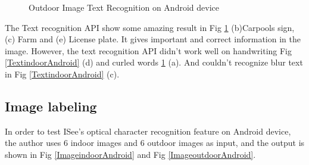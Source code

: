 \documentclass[11pt]{ucscthesis}
\begin{document}
\begin{figure}
  \hfill  
  \hfill
\caption{Outdoor Image Text Recognition on Android device}
\label{TextoutdoorAndroid}
\end{figure}

The Text recognition API show some amazing result in Fig \ref{TextoutdoorAndroid} (b)Carpools sign, (c) Farm and (e) License plate. It gives important and correct information in the image. However, the text recognition API didn't work well on handwriting Fig \ref{TextindoorAndroid} (d) and curled words \ref{TextoutdoorAndroid} (a). And couldn't recognize blur text in Fig \ref{TextindoorAndroid} (c).


\subsection{Image labeling}

 In order to test ISee's optical character recognition feature on Android device, the author uses 6 indoor images and 6 outdoor images as input, and the output is shown in Fig \ref{ImageindoorAndroid} and Fig \ref{ImageoutdoorAndroid}.
 
\end{document}
